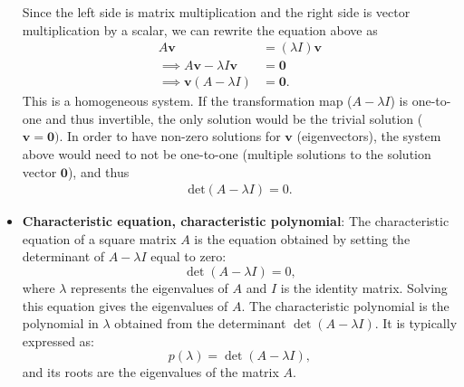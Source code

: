 \documentclass{report}
\begin{document}
\begin{itemize}
            \bigbreak \noindent 
            Since the left side is matrix multiplication and the right side is vector multiplication by a scalar, we can rewrite the equation above as
            \begin{align*}
                A\mathbf{v} &= (\lambda I)\mathbf{v} \\
                \implies A\mathbf{v} - \lambda I \mathbf{v} &= \mathbf{0} \\
                \implies \mathbf{v}(A-\lambda I) &= \mathbf{0}
            .\end{align*}
            \bigbreak \noindent 
            This is a homogeneous system. If the transformation map ($A-\lambda I$) is one-to-one and thus invertible, the only solution would be the trivial solution ($\mathbf{v}  = \mathbf{0})$. In order to have non-zero solutions for $\mathbf{v}$ (eigenvectors), the system above would need to not be one-to-one (multiple solutions to the solution vector $\mathbf{0}$), and thus
            \begin{align*}
                \text{det}(A - \lambda I) = 0
            .\end{align*}
        \item \textbf{Characteristic equation, characteristic polynomial}:
        The characteristic equation of a square matrix \( A \) is the equation obtained by setting the determinant of \( A - \lambda I \) equal to zero:
            \[
                \det(A - \lambda I) = 0,
            \]
            where \( \lambda \) represents the eigenvalues of \( A \) and \( I \) is the identity matrix. Solving this equation gives the eigenvalues of \( A \).
             The characteristic polynomial is the polynomial in \( \lambda \) obtained from the determinant \( \det(A - \lambda I) \). It is typically expressed as:
            \[
                p(\lambda) = \det(A - \lambda I),
            \]
            and its roots are the eigenvalues of the matrix \( A \).


\end{itemize}
\end{document}
